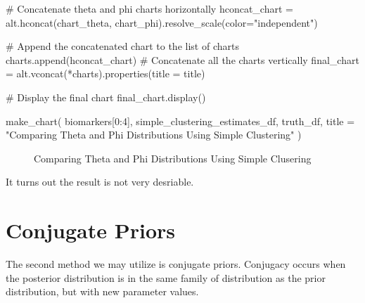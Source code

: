 \documentclass[
  letterpaper,
  DIV=11,
  numbers=noendperiod]{scrreprt}
\newenvironment{Shaded}{\begin{snugshade}}{\end{snugshade}}
\newcommand{\CommentTok}[1]{\textcolor[rgb]{0.37,0.37,0.37}{#1}}
\newcommand{\DecValTok}[1]{\textcolor[rgb]{0.68,0.00,0.00}{#1}}
\newcommand{\NormalTok}[1]{\textcolor[rgb]{0.00,0.23,0.31}{#1}}
\newcommand{\OperatorTok}[1]{\textcolor[rgb]{0.37,0.37,0.37}{#1}}
\newcommand{\StringTok}[1]{\textcolor[rgb]{0.13,0.47,0.30}{#1}}
\begin{document}
\begin{Shaded}
\begin{Highlighting}[]
        \CommentTok{\# Concatenate theta and phi charts horizontally}
\NormalTok{        hconcat\_chart }\OperatorTok{=}\NormalTok{ alt.hconcat(chart\_theta, chart\_phi).resolve\_scale(color}\OperatorTok{=}\StringTok{"independent"}\NormalTok{)}

        \CommentTok{\# Append the concatenated chart to the list of charts}
\NormalTok{        charts.append(hconcat\_chart)}
    \CommentTok{\# Concatenate all the charts vertically}
\NormalTok{    final\_chart }\OperatorTok{=}\NormalTok{ alt.vconcat(}\OperatorTok{*}\NormalTok{charts).properties(title }\OperatorTok{=}\NormalTok{ title)}

    \CommentTok{\# Display the final chart}
\NormalTok{    final\_chart.display()}
\end{Highlighting}
\end{Shaded}

\begin{Shaded}
\begin{Highlighting}[]
\NormalTok{make\_chart(}
\NormalTok{    biomarkers[}\DecValTok{0}\NormalTok{:}\DecValTok{4}\NormalTok{], }
\NormalTok{    simple\_clustering\_estimates\_df, }
\NormalTok{    truth\_df, }
\NormalTok{    title }\OperatorTok{=} \StringTok{"Comparing Theta and Phi Distributions Using Simple Clustering"}
\NormalTok{)}
\end{Highlighting}
\end{Shaded}

\begin{figure}[H]


\caption{\label{fig-estdistparamscopkm}Comparing Theta and Phi
Distributions Using Simple Clusering}

\end{figure}%

It turns out the result is not very desriable.

\section{Conjugate Priors}\label{sec-conjugate-priors}

The second method we may utilize is conjugate priors. Conjugacy occurs
when the posterior distribution is in the same family of distribution as
the prior distribution, but with new parameter values.
\end{document}
